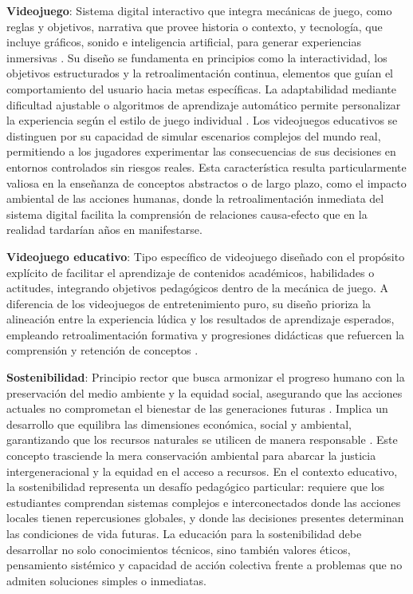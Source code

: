 \textbf{Videojuego}: Sistema digital interactivo que integra mecánicas de juego, como reglas y objetivos, narrativa que provee historia o contexto, y tecnología, que incluye gráficos, sonido e inteligencia artificial, para generar experiencias inmersivas \parencite{Rogers2023}. Su diseño se fundamenta en principios como la interactividad, los objetivos estructurados y la retroalimentación continua, elementos que guían el comportamiento del usuario hacia metas específicas. La adaptabilidad mediante dificultad ajustable o algoritmos de aprendizaje automático permite personalizar la experiencia según el estilo de juego individual \parencite{MortazaviMoradiVahabie2024}. Los videojuegos educativos se distinguen por su capacidad de simular escenarios complejos del mundo real, permitiendo a los jugadores experimentar las consecuencias de sus decisiones en entornos controlados sin riesgos reales. Esta característica resulta particularmente valiosa en la enseñanza de conceptos abstractos o de largo plazo, como el impacto ambiental de las acciones humanas, donde la retroalimentación inmediata del sistema digital facilita la comprensión de relaciones causa-efecto que en la realidad tardarían años en manifestarse.

\textbf{Videojuego educativo}: Tipo específico de videojuego diseñado con el propósito explícito de facilitar el aprendizaje de contenidos académicos, habilidades o actitudes, integrando objetivos pedagógicos dentro de la mecánica de juego. A diferencia de los videojuegos de entretenimiento puro, su diseño prioriza la alineación entre la experiencia lúdica y los resultados de aprendizaje esperados, empleando retroalimentación formativa y progresiones didácticas que refuercen la comprensión y retención de conceptos \parencite{AguileraRoock2022}.

\textbf{Sostenibilidad}: Principio rector que busca armonizar el progreso humano con la preservación del medio ambiente y la equidad social, asegurando que las acciones actuales no comprometan el bienestar de las generaciones futuras \parencite{WCED1987}. Implica un desarrollo que equilibra las dimensiones económica, social y ambiental, garantizando que los recursos naturales se utilicen de manera responsable \parencite{PNUD2021}. Este concepto trasciende la mera conservación ambiental para abarcar la justicia intergeneracional y la equidad en el acceso a recursos. En el contexto educativo, la sostenibilidad representa un desafío pedagógico particular: requiere que los estudiantes comprendan sistemas complejos e interconectados donde las acciones locales tienen repercusiones globales, y donde las decisiones presentes determinan las condiciones de vida futuras. La educación para la sostenibilidad debe desarrollar no solo conocimientos técnicos, sino también valores éticos, pensamiento sistémico y capacidad de acción colectiva frente a problemas que no admiten soluciones simples o inmediatas.


